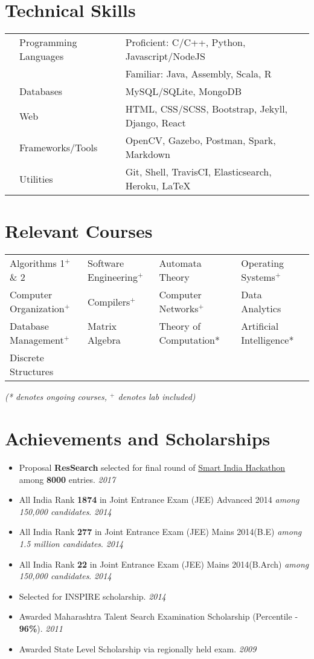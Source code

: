 \documentclass[10pt,a4paper]{moderncv}
\newcommand{\newlink}[2]{
  \href{#1}{\color{blue}#2}
}
\newcommand{\achieve}[2]{
  \item #1 \hfill \textit{#2}
}
\begin{document}
\section*{Technical Skills}
\begin{tabular}{L{0.05cm} L{5cm} l}
  &Programming Languages      &Proficient: C/C++, Python, Javascript/NodeJS\\
  &                           &Familiar: Java, Assembly, Scala, R \\
  &Databases				   &MySQL/SQLite, MongoDB\\
  &Web			               &HTML, CSS/SCSS, Bootstrap, Jekyll, Django, React\\
  &Frameworks/Tools			   &OpenCV, Gazebo, Postman, Spark, Markdown\\
  &Utilities                   &Git, Shell, TravisCI, Elasticsearch, Heroku, \LaTeX\\
\end{tabular}

\section*{Relevant Courses}
\begin{tabular}{p{5.2cm} p{5.2cm} p{5.2cm} p{5.2cm}}
  Algorithms 1$^+$ \& 2 & Software Engineering$^+$ & Automata Theory & Operating Systems$^+$\\
  Computer Organization$^+$ & Compilers$^+$ & Computer Networks$^+$ & Data Analytics\\
  Database Management$^+$ & Matrix Algebra & Theory of Computation* & Artificial Intelligence*\\
  Discrete Structures\\
\end{tabular}
\footnotesize \textit{(* denotes ongoing courses, $^+$ denotes lab included)}

\vspace{-0.1cm}
\section*{Achievements and Scholarships}
\begin{itemize}
  \setlength\itemsep{0.5em}
  \achieve{Proposal \textbf{ResSearch} selected for final round of\newlink{https://drive.google.com/open?id=0B5iU6cWw36rOamZLWHZENWdlY0k}{Smart India Hackathon} among \textbf{8000} entries.}{2017}
  \achieve{All India Rank \textbf{1874} in Joint Entrance Exam (JEE) Advanced 2014 \textit{among 150,000 candidates}.}{2014}
  \achieve{All India Rank \textbf{277} in Joint Entrance Exam (JEE) Mains 2014(B.E) \textit{among 1.5 million candidates}.}{2014}
  \achieve{All India Rank \textbf{22} in Joint Entrance Exam (JEE) Mains 2014(B.Arch) \textit{among 150,000 candidates}.}{2014}
  \achieve{Selected for INSPIRE scholarship.}{2014}
  \achieve{Awarded Maharashtra Talent Search Examination Scholarship (Percentile - \textbf{96\%}).}{2011}
  \achieve{Awarded State Level Scholarship via regionally held exam.}{2009}

\end{itemize}
\end{document}
